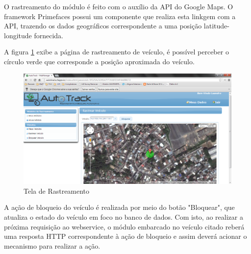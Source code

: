 O rastreamento do módulo é feito com o auxílio da API do Google Maps. O framework Primefaces possui um componente que realiza esta linkgem com a API, trazendo os dados geográficos correspondente a uma posição latitude-longitude fornecida.

A figura \ref{fig:webmanviewrastrear} exibe a página de rastreamento de veículo, é possível perceber o círculo verde que corresponde a posição aproximada do veículo.

\begin{figure}[!htb]
	\centering
	\includegraphics[width=\textwidth]{figures/webmanager_rastrear.png}
	\caption{Tela de Rastreamento}
	\label{fig:webmanviewrastrear}
\end{figure}

A ação de bloqueio do veículo é realizada por meio do botão "Bloquear", que atualiza o estado do veículo em foco no banco de dados. Com isto, ao realizar a próxima requisição ao webservice, o módulo embarcado no veículo citado reberá uma resposta HTTP correspondente à ação de bloqueio e assim deverá acionar o mecanismo para realizar a ação.

\hfill

